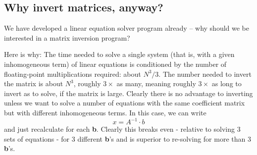 \subsection{Why invert matrices, anyway?}

We have developed a linear equation solver program already
-- why should we be interested in a matrix inversion program?

Here is why: The time needed to solve a single system (that is,
with a given inhomogeneous term) of linear equations is conditioned by the number of floating-point multiplications required:
about $N^3/3$. The number needed to invert the matrix is about $N^3$,
roughly $3\times$ as many, meaning roughly $3\times$ as long to invert as to
solve, if the matrix is large. Clearly there is no advantage to
inverting unless we want to solve a number of equations with the
same coefficient matrix but with different inhomogeneous terms.
In this case, we can write
\begin{equation}
    \label{eq:09_39}
    x = A^{-1} \cdot b
\end{equation} 
and just recalculate for each \textbf{b}. Clearly this breaks even - relative
to solving 3 sets of equations - for 3 different \textbf{b}'s and is superior
to re-solving for more than 3 \textbf{b}'s.

